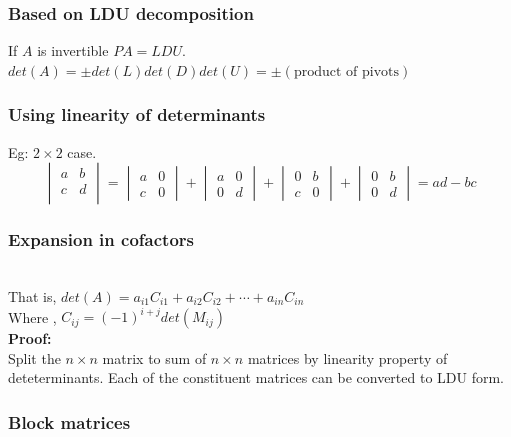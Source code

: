 \subsubsection{Based on LDU decomposition}
If $A$ is invertible $PA = LDU$.\\
$det(A) = \pm det(L)det(D)det(U) = \pm(\text{product of pivots})$\\

\subsubsection{Using linearity of determinants}
Eg: $2\times 2$ case.\\
$$
\begin{vmatrix}
a & b\\
c & d\\
\end{vmatrix}
= 
\begin{vmatrix}
a & 0\\
c & 0
\end{vmatrix}
+
\begin{vmatrix}
a & 0\\
0 & d
\end{vmatrix}
+
\begin{vmatrix}
0 & b\\
c & 0
\end{vmatrix}
+
\begin{vmatrix}
0 & b\\
0 & d
\end{vmatrix}
= ad - bc
$$

\subsubsection{Expansion in cofactors}

\\
That is, $det(A) = a_{i1}C_{i1} + a_{i2}C_{i2} + \cdots + a_{in}C_{in}$\\
Where , $C_{ij} = (-1)^{i+j}det(M_{ij})$\\
\textbf{Proof:}\\
Split the $n\times n$ matrix to sum of $n\times n$ matrices by linearity property of deteterminants. Each of the constituent matrices can be converted to LDU form.  

\subsubsection{Block matrices}

